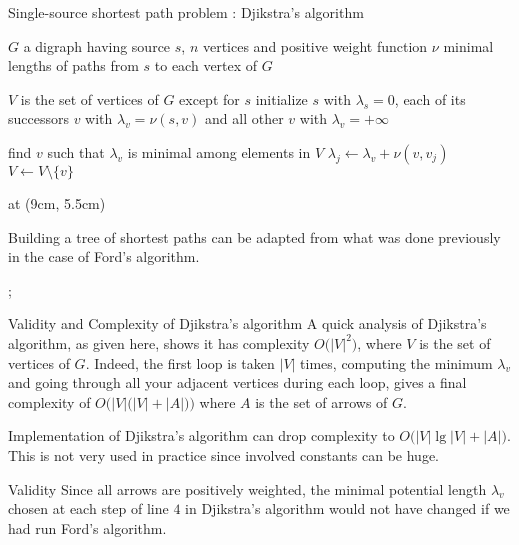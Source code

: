 \documentclass[32pt,aspectratio=169]{beamer}
\begin{document}
\begin{frame}{Single-source shortest path problem : Djikstra's algorithm}
  \small{
    \begin{algorithmic}[1]
      \Require $G$ a digraph having source $s$, $n$
      vertices and positive weight function $\nu$
      \Ensure minimal lengths of paths from $s$ to each vertex of $G$

      \State $V$ is the set of vertices of $G$ except for $s$
      \State initialize $s$ with $\lambda_s =0$, each of its
      successors $v$ with $\lambda_v = \nu(s, v)$
      \Statex and all other $v$ with $\lambda_v = +\infty$

      \State find $v$ such that $\lambda_v$ is minimal among elements in $V$
      \State $\lambda_j \gets \lambda_v + \nu(v, v_j)$
      \EndIf
      \EndFor
      \State $V \gets V\setminus \{v\}$
      \EndWhile

    \end{algorithmic}
  }
  \tikzoverlay[text width=5cm] at (9cm, 5.5cm) {
    \begin{tcolorbox}[
      enhanced,
      parbox = false,
      colback=mLightBrown!10!white,
      colframe=mLightBrown,
      arc=0mm,
      ]
      Building a tree of shortest paths can be adapted from what was
      done previously in the case of Ford's algorithm.
    \end{tcolorbox}%
  };
\end{frame}

\begin{frame}{Validity and Complexity of Djikstra's algorithm}
  A quick analysis of Djikstra's algorithm, as given here, shows it
  has complexity $O\big(|V|^2\big)$, where $V$ is the set of vertices
  of $G$. Indeed, the first loop is taken $|V|$ times, computing the
  minimum $\lambda_v$ and going through all your adjacent vertices
  during each loop, gives a final complexity of
  $O\Big(|V|\big(|V|+|A|\big)\Big)$ where $A$ is the set of arrows of
  $G$.
  \begin{rem}
    Implementation of Djikstra's algorithm can drop complexity to
    $O\big(|V|\lg|V| + |A|\big)$. This is not very used in practice
    since involved constants can be huge.
  \end{rem}
  \begin{halfshyblock}{Validity}
    Since all arrows are positively weighted, the minimal potential
    length $\lambda_v$ chosen at each step of line $4$ in Djikstra's
    algorithm would not have changed if we had run Ford's algorithm.
  \end{halfshyblock}
\end{frame}
\end{document}

